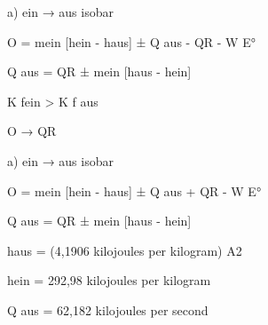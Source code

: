 a) ein → aus isobar

O = mein [hein - haus] ± Q aus - QR - W E°

Q aus = QR ± mein [haus - hein]

K fein > K f aus

O → QR

a) ein → aus isobar

O = mein [hein - haus] ± Q aus + QR - W E°

Q aus = QR ± mein [haus - hein]

haus = (4,1906 kilojoules per kilogram) A2

hein = 292,98 kilojoules per kilogram

Q aus = 62,182 kilojoules per second
